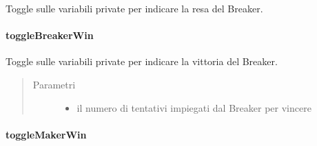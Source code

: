 \documentclass[letterpaper,10pt,italian,openany,oneside]{sphinxmanual}
\begin{document}
\begin{fulllineitems}
\label{\detokenize{source/it/unicam/cs/pa/mastermind/gamecore/MatchState:it.unicam.cs.pa.mastermind.gamecore.MatchState.toggleBreakerGiveUp()}}
Toggle sulle variabili private per indicare la resa del Breaker.

\end{fulllineitems}



\paragraph{toggleBreakerWin}
\label{\detokenize{source/it/unicam/cs/pa/mastermind/gamecore/MatchState:togglebreakerwin}}

\begin{fulllineitems}
\label{\detokenize{source/it/unicam/cs/pa/mastermind/gamecore/MatchState:it.unicam.cs.pa.mastermind.gamecore.MatchState.toggleBreakerWin(int)}}
Toggle sulle variabili private per indicare la vittoria del Breaker.
\begin{quote}\begin{description}
\item[{Parametri}] \leavevmode\begin{itemize}
\item {} 
 \textendash{} il numero di tentativi impiegati dal Breaker per vincere

\end{itemize}

\end{description}\end{quote}

\end{fulllineitems}



\paragraph{toggleMakerWin}
\label{\detokenize{source/it/unicam/cs/pa/mastermind/gamecore/MatchState:togglemakerwin}}
\end{document}
